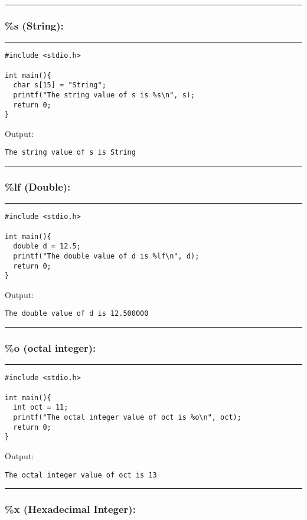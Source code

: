 \documentclass[a4paper]{article}
\begin{document}
\noindent\rule{\textwidth}{0.5pt}

\subsubsection{\%s (String):}
\label{sec:orge6f772f}

\noindent\rule{\textwidth}{0.5pt}
\begin{verbatim}
#include <stdio.h>

int main(){
  char s[15] = "String";
  printf("The string value of s is %s\n", s);
  return 0;
}
\end{verbatim}
Output:
\begin{verbatim}
The string value of s is String
\end{verbatim}

\noindent\rule{\textwidth}{0.5pt}

\subsubsection{\%lf (Double):}
\label{sec:org61f79cb}

\noindent\rule{\textwidth}{0.5pt}
\begin{verbatim}
#include <stdio.h>

int main(){
  double d = 12.5;
  printf("The double value of d is %lf\n", d);
  return 0;
}
\end{verbatim}
Output:
\begin{verbatim}
The double value of d is 12.500000
\end{verbatim}

\noindent\rule{\textwidth}{0.5pt}

\subsubsection{\%o (octal integer):}
\label{sec:org2dd8196}
\noindent\rule{\textwidth}{0.5pt}
\begin{verbatim}
#include <stdio.h>

int main(){
  int oct = 11;
  printf("The octal integer value of oct is %o\n", oct);
  return 0;
}
\end{verbatim}
Output:
\begin{verbatim}
The octal integer value of oct is 13
\end{verbatim}

\noindent\rule{\textwidth}{0.5pt}

\subsubsection{\%x (Hexadecimal Integer):}
\label{sec:orgb5dbe00}
\end{document}
